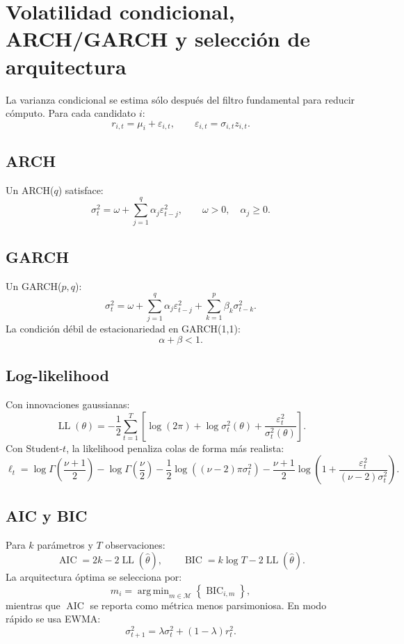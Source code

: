 \documentclass[11pt,letterpaper]{article}
\DeclareMathOperator*{\argmin}{arg\,min}
\DeclareMathOperator{\LL}{LL}
\DeclareMathOperator{\AIC}{AIC}
\DeclareMathOperator{\BIC}{BIC}
\newcommand{\1}{\mathbf{1}}
\newcommand{\eps}{\varepsilon}
\begin{document}
\newpage
\section{Volatilidad condicional, ARCH/GARCH y selección de arquitectura}

La varianza condicional se estima sólo después del filtro fundamental para reducir cómputo. Para cada candidato \(i\):
\[
    r_{i,t}=\mu_i+\eps_{i,t},
    \qquad
    \eps_{i,t}=\sigma_{i,t}z_{i,t}.
\]

\subsection{ARCH}

Un ARCH(\(q\)) satisface:
\[
    \sigma_t^2
    =
    \omega+\sum_{j=1}^{q}\alpha_j\eps_{t-j}^2,
    \qquad
    \omega>0,\quad \alpha_j\ge 0.
\]

\subsection{GARCH}

Un GARCH(\(p,q\)):
\[
    \sigma_t^2
    =
    \omega
    +
    \sum_{j=1}^{q}\alpha_j\eps_{t-j}^2
    +
    \sum_{k=1}^{p}\beta_k\sigma_{t-k}^2.
\]
La condición débil de estacionariedad en GARCH(1,1):
\[
    \alpha+\beta<1.
\]

\subsection{Log-likelihood}

Con innovaciones gaussianas:
\[
    \LL(\theta)
    =
    -\frac{1}{2}
    \sum_{t=1}^{T}
    \left[
        \log(2\pi)
        +
        \log\sigma_t^2(\theta)
        +
        \frac{\eps_t^2}{\sigma_t^2(\theta)}
    \right].
\]
Con Student-\(t\), la likelihood penaliza colas de forma más realista:
\[
    \ell_t
    =
    \log\Gamma\left(\frac{\nu+1}{2}\right)
    -
    \log\Gamma\left(\frac{\nu}{2}\right)
    -
    \frac{1}{2}\log((\nu-2)\pi\sigma_t^2)
    -
    \frac{\nu+1}{2}
    \log\left(1+\frac{\eps_t^2}{(\nu-2)\sigma_t^2}\right).
\]

\subsection{AIC y BIC}

Para \(k\) parámetros y \(T\) observaciones:
\[
    \AIC = 2k - 2\LL(\hat\theta),
    \qquad
    \BIC = k\log T - 2\LL(\hat\theta).
\]
La arquitectura óptima se selecciona por:
\[
    \hat m_i
    =
    \argmin_{m\in\mathcal{M}}
    \left\{
        \BIC_{i,m}
    \right\},
\]
mientras que \(\AIC\) se reporta como métrica menos parsimoniosa. En modo rápido se usa EWMA:
\[
    \sigma_{t+1}^2
    =
    \lambda\sigma_t^2+(1-\lambda)r_t^2.
\]
\end{document}
